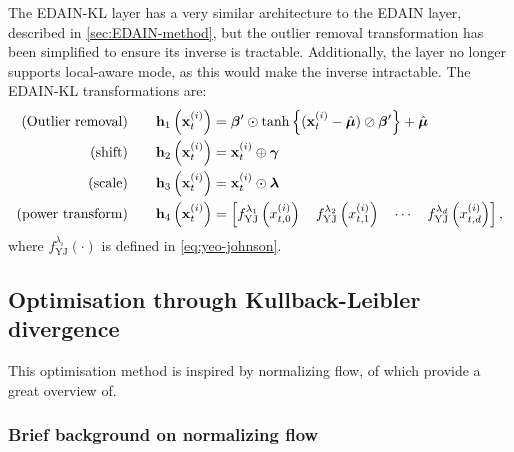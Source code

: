 \documentclass{statsmsc}
\begin{document}
The \ac{EDAIN-KL} layer has a very similar architecture to the \ac{EDAIN} layer, described in
\cref{sec:EDAIN-method}, but the outlier removal transformation has been simplified to ensure its
inverse is tractable. Additionally, the layer no longer supports local-aware mode, as this
would make the inverse intractable. The \ac{EDAIN-KL} transformations are:
\begin{align}
    \textrm{(Outlier removal)} \qquad& \mathbf{h}_1\left(\mathbf{x}^{(i)}_t\right)=\bm\beta' \odot \tanh\left\{(\mathbf{x}^{(i)}_t - \hat{\bm\mu}) \oslash \bm\beta' \right\}+\hat{\bm\mu} \label{eq:kl1}\\
    \textrm{(shift)} \qquad& \mathbf{h}_2\left(\mathbf{x}^{(i)}_t\right)=\mathbf{x}^{(i)}_t\oplus \bm\gamma \label{eq:kl2}\\
    \textrm{(scale)} \qquad& \mathbf{h}_3\left(\mathbf{x}^{(i)}_t\right)=\mathbf{x}^{(i)}_t \odot \bm\lambda  \label{eq:kl3}\\
    \textrm{(power transform)} \qquad& \mathbf{h}_4\left(\mathbf{x}^{(i)}_t\right)=\left[
        f^{\lambda_1}_{\textrm{YJ}}\left(x^{(i)}_{t,0}\right)
        \quad f^{\lambda_2}_{\textrm{YJ}}\left(x^{(i)}_{t,1}\right)
        \quad \cdots
        \quad f^{\lambda_d}_{\textrm{YJ}}\left(x^{(i)}_{t,d}\right)
    \right], \label{eq:kl4}
\end{align}
where $f^{\lambda_i}_{\textrm{YJ}}(\cdot)$ is defined in \cref{eq:yeo-johnson}.

\subsection{Optimisation through Kullback-Leibler divergence}%
\label{sub:Optimisation through Kullback-Leibler divergence}

This optimisation method is inspired by normalizing flow, of which \citeauthor{normalizing_flows}
provide a great overview of.

\subsubsection{Brief background on normalizing flow}%
\label{ssub:Brief background on normalizing flow}
\end{document}
